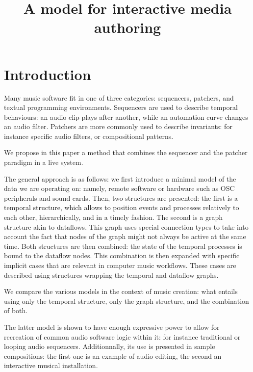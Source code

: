 \documentclass[applsci,article,submit,moreauthors,pdftex,10pt,a4paper]{mdpi}
\title{A model for interactive media authoring}
\begin{document}
\section{Introduction}
Many music software fit in one of three categories: sequencers, patchers, and textual programming environments. Sequencers are used to describe temporal behaviours: an audio clip plays after another, while an automation curve changes an audio filter. Patchers are more commonly used to describe invariants: for instance specific audio filters, or compositional patterns. 

We propose in this paper a method that combines the sequencer and the patcher paradigm in a live system.  

The general approach is as follows: we first introduce a minimal model of the data we are operating on: namely, remote software or hardware such as OSC peripherals and sound cards. Then, two structures are presented: the first is a temporal structure, which allows to position events and processes relatively to each other, hierarchically, and in a timely fashion. The second is a graph structure akin to dataflows. This graph uses special connection types to take into account the fact that nodes of the graph might not always be active at the same time. Both structures are then combined: the state of the temporal processes is bound to the dataflow nodes. This combination is then expanded with specific implicit cases that are relevant in computer music workflows. These cases are described using structures wrapping the temporal and dataflow graphs. 

We compare the various models in the context of music creation: what entails using only the temporal structure, only the graph structure, and the combination of both. 

The latter model is shown to have enough expressive power to allow for recreation of common audio software logic within it: for instance traditional or looping audio sequencers. Additionnally, its use is presented in sample compositions: the first one is an example of audio editing, the second an interactive musical installation.



\end{document}
